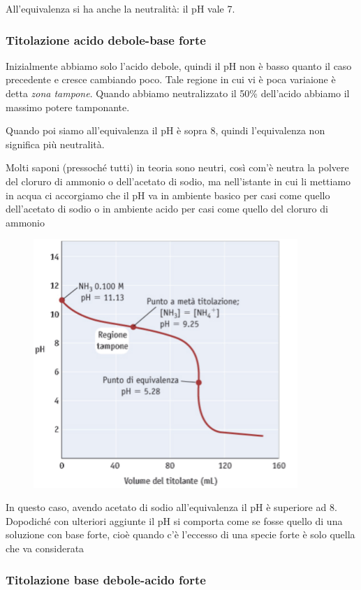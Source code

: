 All'equivalenza si ha anche la neutralità: il pH vale 7.

\subsubsection{Titolazione acido debole-base forte}
Inizialmente abbiamo solo l'acido debole, quindi il pH non è basso quanto il caso precedente e cresce cambiando poco. Tale regione in cui vi è poca variaione è detta \textit{zona tampone}. Quando abbiamo neutralizzato il 50\% dell'acido abbiamo il massimo potere tamponante.

Quando poi siamo all'equivalenza il pH è sopra 8, quindi l'equivalenza non significa più neutralità.

Molti saponi (pressoché tutti) in teoria sono neutri, così com'è neutra la polvere del cloruro di ammonio o dell'acetato di sodio, ma nell'istante in cui li mettiamo in acqua ci accorgiamo che il pH va in ambiente basico per casi come quello dell'acetato di sodio o in ambiente acido per casi come quello del cloruro di ammonio

\begin{figure}[H]
    \centering
    \includegraphics[width=10cm]{immagini/titolazione_base_forte_acido_debole.png}
\end{figure}

In questo caso, avendo acetato di sodio all'equivalenza il pH è superiore ad 8. Dopodiché con ulteriori aggiunte il pH si comporta come se fosse quello di una soluzione con base forte, cioè quando c'è l'eccesso di una specie forte è solo quella che va considerata

\subsubsection{Titolazione base debole-acido forte}

